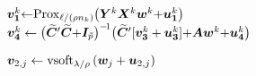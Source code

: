 \begin{figure}
{\begin{minipage}{0.999\textwidth}
\begin{algorithm}[H]
\begin{algorithmic}[1]
\begin{spacing}{1.09}
{			%
			\State\HSPACE ${\bm{v_1}^k} {\leftarrow} \mathrm{Prox}_{\ell/(\rho{}n_k)}\hspace{-2pt}\left({\bm{Y}}^k{\bm{X}}^k{\bm{w}}^k{+}{\bm{u_1}^k}\right)$%
			\vspace{-1pt}
			\State\HSPACE ${\bm{v_4}^k} \leftarrow 
				\big({\bm{\widetilde{C}}}'{\bm{\widetilde{C}}}{+}{\bm{I}}_{\tilde{p}}\big)^{-\!1}
				\big({\bm{\widetilde{C}}}'[{\bm{v_3}^k}+{\bm{u_3}^k}]{+}{\ensuremath{\bm{A}}}{\ensuremath{\bm{w}}}^k{+}{\bm{u_4}^k}\big)$ 
				\vspace{5.0pt}
		\EndFor

		\vspace{4pt}
		\State\HSPACE $\bm{v}_{2,j} \leftarrow 
			\mathrm{vsoft}_{\lambda/\rho}\left({\bm{w}}_j+{\bm{u}}_{2,j}\right)$%
		\EndFor

}
\end{spacing}
\end{algorithmic}
\end{algorithm}
\end{minipage}}
\end{figure}
